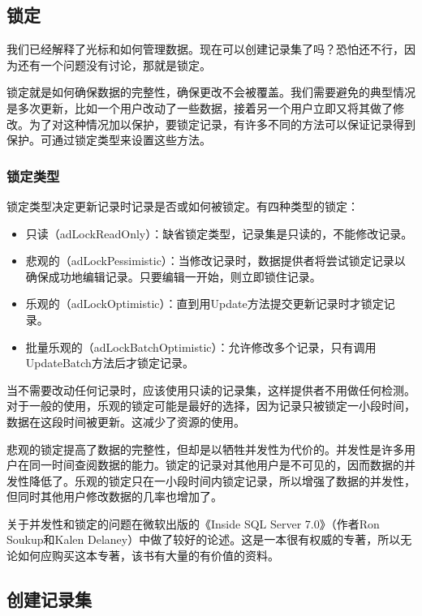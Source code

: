 \subsection{锁定}

       我们已经解释了光标和如何管理数据。现在可以创建记录集了吗？恐怕还不行，因为还有一个问题没有讨论，那就是锁定。

       锁定就是如何确保数据的完整性，确保更改不会被覆盖。我们需要避免的典型情况是多次更新，比如一个用户改动了一些数据，接着另一个用户立即又将其做了修改。为了对这种情况加以保护，要锁定记录，有许多不同的方法可以保证记录得到保护。可通过锁定类型来设置这些方法。

\subsubsection{锁定类型}

锁定类型决定更新记录时记录是否或如何被锁定。有四种类型的锁定：
\begin{itemize}
	\item 只读（adLockReadOnly）：缺省锁定类型，记录集是只读的，不能修改记录。
	\item 悲观的（adLockPessimistic）：当修改记录时，数据提供者将尝试锁定记录以确保成功地编辑记录。只要编辑一开始，则立即锁住记录。
	\item 乐观的（adLockOptimistic）：直到用Update方法提交更新记录时才锁定记录。

	\item 批量乐观的（adLockBatchOptimistic）：允许修改多个记录，只有调用UpdateBatch方法后才锁定记录。
\end{itemize}
当不需要改动任何记录时，应该使用只读的记录集，这样提供者不用做任何检测。对于一般的使用，乐观的锁定可能是最好的选择，因为记录只被锁定一小段时间，数据在这段时间被更新。这减少了资源的使用。

悲观的锁定提高了数据的完整性，但却是以牺牲并发性为代价的。并发性是许多用户在同一时间查阅数据的能力。锁定的记录对其他用户是不可见的，因而数据的并发性降低了。乐观的锁定只在一小段时间内锁定记录，所以增强了数据的并发性，但同时其他用户修改数据的几率也增加了。

关于并发性和锁定的问题在微软出版的《Inside SQL Server 7.0》（作者Ron Soukup和Kalen Delaney）中做了较好的论述。这是一本很有权威的专著，所以无论如何应购买这本专著，该书有大量的有价值的资料。

\subsection{创建记录集} 

